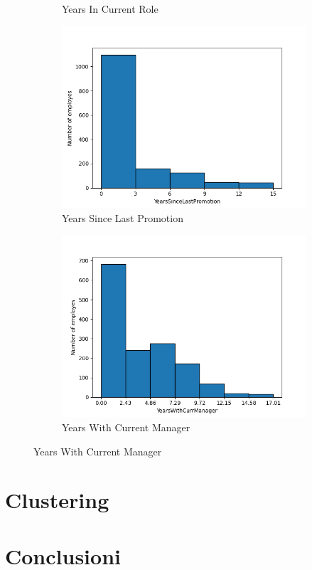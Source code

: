 \documentclass[english]{article}
\begin{document}
\begin{figure} [h]
\begin{subfigure}{.5\textwidth}
  \caption{Years In Current Role}
  \label{fig:sfig22}
\end{subfigure}
\begin{subfigure}{.5\textwidth}
  \centering
  \includegraphics[width=.8\linewidth]{YearsSinceLastPromotion.png}
  \caption{Years Since Last Promotion}
  \label{fig:sfig23}
\end{subfigure}%
\begin{subfigure}{.5\textwidth}
  \centering
  \includegraphics[width=.8\linewidth]{YearsWithCurrManager.png}
  \caption{Years With Current Manager}
  \label{fig:sfig24}
\end{subfigure}
\end{figure}

\section{Clustering}

\section{Conclusioni}
\end{document}
